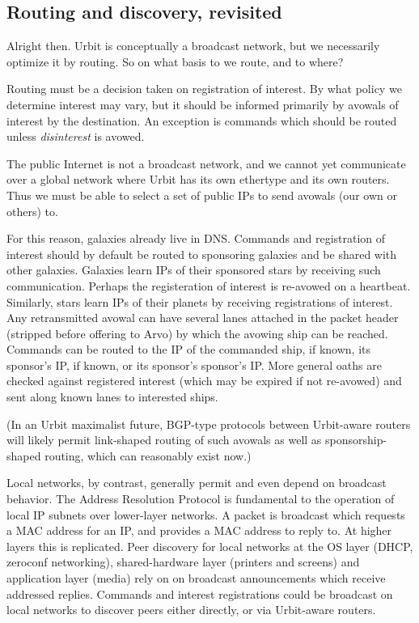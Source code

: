 \subsection{Routing and discovery, revisited}

Alright then. Urbit is conceptually a broadcast network, but we
necessarily optimize it by routing. So on what basis to we route, and to
where?

Routing must be a decision taken on registration of interest. By what
policy we determine interest may vary, but it should be informed
primarily by avowals of interest by the destination. An exception is
commands which should be routed unless \emph{disinterest} is avowed.

The public Internet is not a broadcast network, and we cannot yet
communicate over a global network where Urbit has its own ethertype and
its own routers. Thus we must be able to select a set of public IPs to
send avowals (our own or others) to.

For this reason, galaxies already live in DNS. Commands and registration
of interest should by default be routed to sponsoring galaxies and be
shared with other galaxies. Galaxies learn IPs of their sponsored stars
by receiving such communication. Perhaps the registeration of interest
is re-avowed on a heartbeat. Similarly, stars learn IPs of their planets
by receiving registrations of interest. Any retransmitted avowal can
have several lanes attached in the packet header (stripped before
offering to Arvo) by which the avowing ship can be reached. Commands can
be routed to the IP of the commanded ship, if known, its sponsor's IP,
if known, or its sponsor's sponsor's IP. More general oaths are checked
against registered interest (which may be expired if not re-avowed) and
sent along known lanes to interested ships.

(In an Urbit maximalist future, BGP-type protocols between Urbit-aware
routers will likely permit link-shaped routing of such avowals as well
as sponsorship-shaped routing, which can reasonably exist now.)

Local networks, by contrast, generally permit and even depend on
broadcast behavior. The Address Resolution Protocol is fundamental to
the operation of local IP subnets over lower-layer networks. A packet is
broadcast which requests a MAC address for an IP, and provides a MAC
address to reply to. At higher layers this is replicated. Peer discovery
for local networks at the OS layer (DHCP, zeroconf networking),
shared-hardware layer (printers and screens) and application layer
(media) rely on on broadcast announcements which receive addressed
replies. Commands and interest registrations could be broadcast on local
networks to discover peers either directly, or via Urbit-aware routers.
